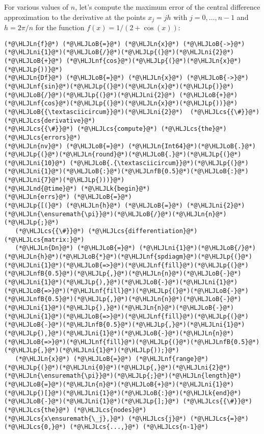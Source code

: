 \documentclass[12pt,landscape]{article}
\newcommand{\HLJLk}[1]{\textcolor[RGB]{148,91,176}{\textbf{#1}}}
\newcommand{\HLJLn}[1]{#1}
\newcommand{\HLJLnd}[1]{\textcolor[RGB]{214,102,97}{#1}}
\newcommand{\HLJLnf}[1]{\textcolor[RGB]{66,102,213}{#1}}
\newcommand{\HLJLnfB}[1]{\textcolor[RGB]{59,151,46}{#1}}
\newcommand{\HLJLni}[1]{\textcolor[RGB]{59,151,46}{#1}}
\newcommand{\HLJLoB}[1]{\textcolor[RGB]{102,102,102}{\textbf{#1}}}
\newcommand{\HLJLp}[1]{#1}
\newcommand{\HLJLcs}[1]{\textcolor[RGB]{153,153,119}{\textit{#1}}}
\begin{document}
{For various values of $n$, let's compute the maximum error of the central difference approximation to the derivative at the points $x_j = jh$ with $j = 0, \ldots, n-1$ and $h = 2\pi/n$ for the function $f(x) = 1/(2 + \cos(x))$:


\begin{lstlisting}
(*@\HLJLn{f}@*) (*@\HLJLoB{=}@*) (*@\HLJLn{x}@*) (*@\HLJLoB{->}@*) (*@\HLJLni{1}@*)(*@\HLJLoB{/}@*)(*@\HLJLp{(}@*)(*@\HLJLni{2}@*) (*@\HLJLoB{+}@*) (*@\HLJLnf{cos}@*)(*@\HLJLp{(}@*)(*@\HLJLn{x}@*)(*@\HLJLp{))}@*)
(*@\HLJLn{Df}@*) (*@\HLJLoB{=}@*) (*@\HLJLn{x}@*) (*@\HLJLoB{->}@*) (*@\HLJLnf{sin}@*)(*@\HLJLp{(}@*)(*@\HLJLn{x}@*)(*@\HLJLp{)}@*)(*@\HLJLoB{/}@*)(*@\HLJLp{(}@*)(*@\HLJLni{2}@*) (*@\HLJLoB{+}@*) (*@\HLJLnf{cos}@*)(*@\HLJLp{(}@*)(*@\HLJLn{x}@*)(*@\HLJLp{))}@*)(*@\HLJLoB{{\textasciicircum}}@*)(*@\HLJLni{2}@*)  (*@\HLJLcs{{\#}}@*) (*@\HLJLcs{derivative}@*)
(*@\HLJLcs{{\#}}@*) (*@\HLJLcs{compute}@*) (*@\HLJLcs{the}@*) (*@\HLJLcs{errors}@*)
(*@\HLJLn{nv}@*) (*@\HLJLoB{=}@*) (*@\HLJLn{Int64}@*)(*@\HLJLoB{.}@*)(*@\HLJLp{(}@*)(*@\HLJLn{round}@*)(*@\HLJLoB{.}@*)(*@\HLJLp{(}@*)(*@\HLJLni{10}@*) (*@\HLJLoB{.{\textasciicircum}}@*)(*@\HLJLp{(}@*)(*@\HLJLni{1}@*)(*@\HLJLoB{:}@*)(*@\HLJLnfB{0.5}@*)(*@\HLJLoB{:}@*)(*@\HLJLni{7}@*)(*@\HLJLp{)))}@*)
(*@\HLJLnd{@time}@*) (*@\HLJLk{begin}@*)
(*@\HLJLn{errs}@*) (*@\HLJLoB{=}@*) 
(*@\HLJLp{[(}@*) (*@\HLJLn{h}@*) (*@\HLJLoB{=}@*) (*@\HLJLni{2}@*)(*@\HLJLn{\ensuremath{\pi}}@*)(*@\HLJLoB{/}@*)(*@\HLJLn{n}@*)(*@\HLJLp{;}@*)
   (*@\HLJLcs{{\#}}@*) (*@\HLJLcs{differentiation}@*) (*@\HLJLcs{matrix:}@*)
   (*@\HLJLn{Dn}@*) (*@\HLJLoB{=}@*) (*@\HLJLni{1}@*)(*@\HLJLoB{/}@*)(*@\HLJLn{h}@*)(*@\HLJLoB{*}@*)(*@\HLJLnf{spdiagm}@*)(*@\HLJLp{(}@*)(*@\HLJLni{1}@*)(*@\HLJLoB{=>}@*)(*@\HLJLnf{fill}@*)(*@\HLJLp{(}@*)(*@\HLJLnfB{0.5}@*)(*@\HLJLp{,}@*)(*@\HLJLn{n}@*)(*@\HLJLoB{-}@*)(*@\HLJLni{1}@*)(*@\HLJLp{),}@*)(*@\HLJLoB{-}@*)(*@\HLJLni{1}@*)(*@\HLJLoB{=>}@*)(*@\HLJLnf{fill}@*)(*@\HLJLp{(}@*)(*@\HLJLoB{-}@*)(*@\HLJLnfB{0.5}@*)(*@\HLJLp{,}@*)(*@\HLJLn{n}@*)(*@\HLJLoB{-}@*)(*@\HLJLni{1}@*)(*@\HLJLp{),}@*)(*@\HLJLn{n}@*)(*@\HLJLoB{-}@*)(*@\HLJLni{1}@*)(*@\HLJLoB{=>}@*)(*@\HLJLnf{fill}@*)(*@\HLJLp{(}@*)(*@\HLJLoB{-}@*)(*@\HLJLnfB{0.5}@*)(*@\HLJLp{,}@*)(*@\HLJLni{1}@*)(*@\HLJLp{),}@*)(*@\HLJLni{1}@*)(*@\HLJLoB{-}@*)(*@\HLJLn{n}@*)(*@\HLJLoB{=>}@*)(*@\HLJLnf{fill}@*)(*@\HLJLp{(}@*)(*@\HLJLnfB{0.5}@*)(*@\HLJLp{,}@*)(*@\HLJLni{1}@*)(*@\HLJLp{));}@*)
   (*@\HLJLn{x}@*) (*@\HLJLoB{=}@*) (*@\HLJLnf{range}@*)(*@\HLJLp{(}@*)(*@\HLJLni{0}@*)(*@\HLJLp{,}@*)(*@\HLJLni{2}@*)(*@\HLJLn{\ensuremath{\pi}}@*)(*@\HLJLp{;}@*)(*@\HLJLn{length}@*)(*@\HLJLoB{=}@*)(*@\HLJLn{n}@*)(*@\HLJLoB{+}@*)(*@\HLJLni{1}@*)(*@\HLJLp{)[}@*)(*@\HLJLni{1}@*)(*@\HLJLoB{:}@*)(*@\HLJLk{end}@*)(*@\HLJLoB{-}@*)(*@\HLJLni{1}@*)(*@\HLJLp{];}@*) (*@\HLJLcs{{\#}}@*) (*@\HLJLcs{the}@*) (*@\HLJLcs{nodes}@*) (*@\HLJLcs{x\ensuremath{\_j},}@*) (*@\HLJLcs{j}@*) (*@\HLJLcs{=}@*) (*@\HLJLcs{0,}@*) (*@\HLJLcs{...,}@*) (*@\HLJLcs{n-1}@*)

\end{lstlisting}}
\end{document}
